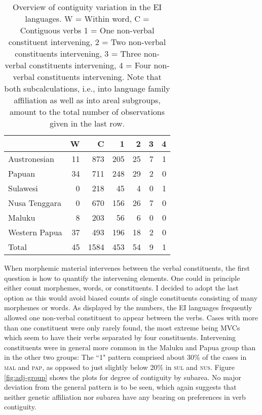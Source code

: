 \begin{table}


\begin{tabular}{lrrrrrr}
  \hline\hline
 & W & C & 1 & 2 & 3 & 4 \tabularnewline 
  \hline
   Austronesian &   11 & 873 & 205 &  25 &  7 & 1 \tabularnewline 
   Papuan &  34 & 711 & 248 &  29 & 2 & 0 \tabularnewline 
   \hline
   Sulawesi &   0 & 218 &  45 &   4 &   0 &   1 \tabularnewline
   Nusa Tenggara &   0 & 670 & 156 &  26 &   7 &   0 \tabularnewline
   Maluku &   8 &  203 &  56 &  6 &   0 &   0 \tabularnewline 
   Western Papua &  37 & 493 & 196 &  18 &   2 &   0 \tabularnewline 
   \hline\hline
   Total & 45 & 1584 & 453 & 54 & 9 & 1 \tabularnewline
\hline
\end{tabular}
\caption[Contiguity variation in the EI corpus]{Overview of contiguity variation in the EI languages. W = Within word, C = Contiguous verbs 1 = One non-verbal constituent intervening, 2 = Two non-verbal constituents intervening, 3 = Three non-verbal constituents intervening, 4 = Four non-verbal constituents intervening. Note that both subcalculations, i.e., into language family affiliation as well as into areal subgroups, amount to the total number of observations given in the last row.}
\label{table:Contiguity_overview}


\end{table}


When morphemic material intervenes between the verbal constituents, the first question is how to quantify the intervening elements. One could in principle either count morphemes, words, or constituents. I decided to adopt the last option as this would avoid biased counts of single constituents consisting of many morphemes or words. As displayed by the numbers, the EI languages frequently allowed one non-verbal constituent to appear between the verbs. Cases with more than one constituent were only rarely found, the most extreme being MVCs which seem to have their verbs separated by four constituents. Intervening constituents were in general more common in the Maluku and Papua group than in the other two groups: The ``1" pattern comprised about 30\% of the cases in  \textsc{mal} and \textsc{pap}, as opposed to just slightly below 20\% in \textsc{sul} and \textsc{nus}. Figure \ref{fig:adj-group} shows the plots for degree of contiguity by subarea. No major deviation from the general pattern is to be seen, which again suggests that neither genetic affiliation nor subarea have any bearing on preferences in verb contiguity.

